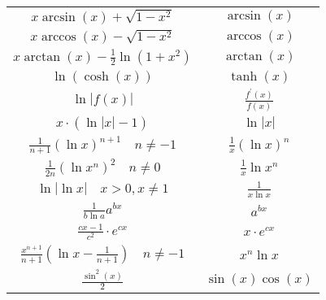 \begin{tabular}{c||c}
     $x \arcsin (x)+\sqrt{1-x^{2}}$ & $\arcsin (x)$ \\
     $x \arccos (x)-\sqrt{1-x^{2}}$ & $\arccos (x)$ \\
     $x \arctan (x)-\frac{1}{2} \ln \left(1+x^{2}\right)$ & $\arctan (x)$ \\
      $\ln (\cosh (x))$ & $\tanh (x)$ \\
      $\ln |f(x)|$ & $\frac{f^{\prime}(x)}{f(x)}$ \\
     $x \cdot(\ln |x|-1)$ & $\ln |x|$ \\
     $\frac{1}{n+1}(\ln x)^{n+1} \quad n \neq-1$ & $\frac{1}{x}(\ln x)^{n}$ \\
     $\frac{1}{2 n}\left(\ln x^{n}\right)^{2} \quad n \neq 0$ & $\frac{1}{x} \ln x^{n}$ \\
      $\ln |\ln x| \quad x>0, x \neq 1$ & $\frac{1}{x \ln x}$ \\
     $\frac{1}{b \ln a} a^{b x}$ & $a^{b x}$ \\
     $\frac{c x-1}{c^{2}} \cdot e^{c x}$ & $x \cdot e^{c x}$ \\
     $\frac{x^{n+1}}{n+1}\left(\ln x-\frac{1}{n+1}\right) \quad n \neq-1$ & $x^{n} \ln x$ \\
    $\frac{\sin ^{2}(x)}{2}$ &
    $\sin (x) \cos (x)$ \\
    \hline
    \end{tabular}

